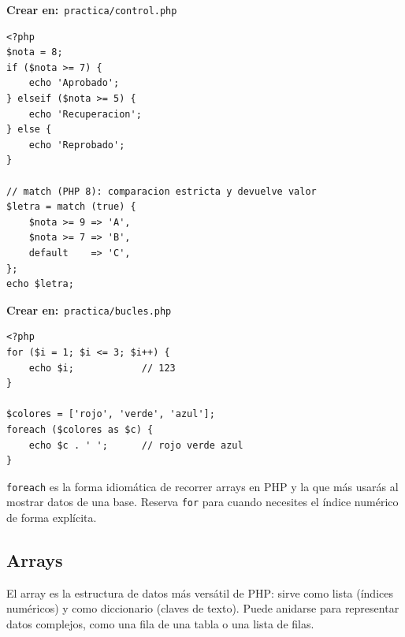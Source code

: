 \documentclass[11pt]{article}
\begin{document}
{\small\color{phpazulo}\textbf{Crear en:}~}\texttt{practica/\allowbreak{}control.\allowbreak{}php}\par\nobreak\vspace{-1pt}
\begin{cajacodigo}
\begin{lstlisting}[style=php]
<?php
$nota = 8;
if ($nota >= 7) {
    echo 'Aprobado';
} elseif ($nota >= 5) {
    echo 'Recuperacion';
} else {
    echo 'Reprobado';
}

// match (PHP 8): comparacion estricta y devuelve valor
$letra = match (true) {
    $nota >= 9 => 'A',
    $nota >= 7 => 'B',
    default    => 'C',
};
echo $letra;
\end{lstlisting}
\end{cajacodigo}
\vspace{2pt}
{\small\color{phpazulo}\textbf{Crear en:}~}\texttt{practica/\allowbreak{}bucles.\allowbreak{}php}\par\nobreak\vspace{-1pt}
\begin{cajacodigo}[Bucles]
\begin{lstlisting}[style=php]
<?php
for ($i = 1; $i <= 3; $i++) {
    echo $i;            // 123
}

$colores = ['rojo', 'verde', 'azul'];
foreach ($colores as $c) {
    echo $c . ' ';      // rojo verde azul
}
\end{lstlisting}
\end{cajacodigo}
\vspace{2pt}
\texttt{foreach} es la forma idiomática de recorrer arrays en PHP y la que más usarás al mostrar datos de una base. Reserva \texttt{for} para cuando necesites el índice numérico de forma explícita.

\subsection{Arrays}
El array es la estructura de datos más versátil de PHP: sirve como lista (índices numéricos) y como diccionario (claves de texto). Puede anidarse para representar datos complejos, como una fila de una tabla o una lista de filas.
\end{document}
